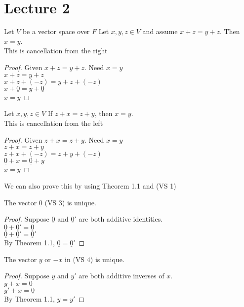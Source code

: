 \documentclass[answers,12pt,addpoints]{exam}
\begin{document}
\section{Lecture 2}
\begin{theorem}[Theorem 1.1]
    Let $V$ be a vector space over $F$ Let $x,y,z \in V$ and assume $x + z = y + z$. Then $x = y$.\\
    This is cancellation from the right
    \begin{proof}
        Given $x + z = y + z$. Need $x=y$\\
        $x + z = y + z$\\
        $x + z + (-z) = y + z + (-z)$\\
        $x + \underline{0} = y + \underline{0}$\\
        $x = y$
    \end{proof}
\end{theorem}
\begin{theorem}[Theorem 1.1 ']
    Let $x,y,z \in V$ If $z +x = z + y$, then $x = y$.\\
    This is cancellation from the left
    \begin{proof}
        Given $z + x = z + y$. Need $x=y$\\
        $z + x = z + y$\\
        $z + x + (-z) = z + y + (-z)$\\
        $\underline{0} + x = \underline{0} + y$\\
        $x = y$
    \end{proof}
    We can also prove this by using Theorem 1.1 and (VS 1)
\end{theorem}
\begin{corollary}[Corollary 1]
    The vector $\underline{0}$ (VS 3) is unique.
    \begin{proof}
        Suppose $\underline{0}$ and $\underline{0}'$ are both additive identities.\\
        $\underline{0} + \underline{0}' = \underline{0}$\\
        $\underline{0} + \underline{0}' = \underline{0}'$\\
        By Theorem 1.1, $\underline{0} = \underline{0}'$
    \end{proof}
\end{corollary}
\begin{corollary}[Corollary 2]
    The vector $y$ or $-x$ in (VS 4) is unique.
    \begin{proof}
        Suppose $y$ and $y'$ are both additive inverses of $x$.\\
        $y + x = \underline{0}$\\
        $y' + x = \underline{0}$\\
        By Theorem 1.1, $y = y'$
    \end{proof}
\end{corollary}
\end{document}
